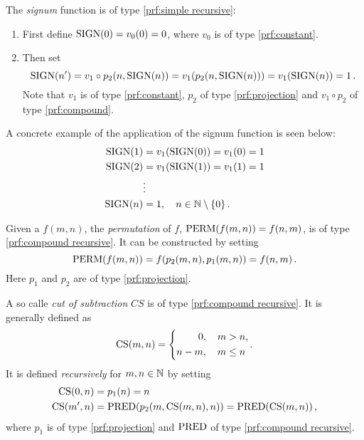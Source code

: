 \documentclass[11pt,a4paper]{article}
\begin{document}
\begin{example}[VI]\label{exa:PRF sign}
    The \emph{signum} function is of type \eqref{prf:simple recursive}:
    \begin{enumerate}
        \item First define \(\operatorname{SIGN}(0) = v_0(0)  = 0\),
            where \(v_0\) is of type \eqref{prf:constant}.
        \item Then set \[\operatorname{SIGN}(n') = v_1\circ p_2(n,\operatorname{SIGN}(n))
            = v_1(p_2(n,\operatorname{SIGN}(n))) = v_1(\operatorname{SIGN}(n)) = 1\,.\]
            Note that \(v_1\) is of type \eqref{prf:constant},
            \(p_2\) of type \eqref{prf:projection}
            and \(v_1\circ p_2\) of type \eqref{prf:compound}.
    \end{enumerate}
\end{example}

A concrete example of the application of the signum function
is seen below:
\begin{align*}
    \operatorname{SIGN}(1) &= v_1(\operatorname{SIGN}(0)) = v_1(0) = 1 \\
    \operatorname{SIGN}(2) &= v_1(\operatorname{SIGN}(1)) = v_1(1) = 1 \\
             &\vdots \\
    \operatorname{SIGN}(n) &= 1, \quad n\in\mathbb{N}\setminus\{0\}\,.
\end{align*}

\begin{example}[VII]\label{exa:PRF permutation}
    Given a \PRF{} \(f(m,n)\), the \emph{permutation} of
    \(f\), \(\operatorname{PERM}(f(m,n)) = f(n,m)\), is of type
    \eqref{prf:compound recursive}. It can be constructed by setting
    \begin{equation*}
        \operatorname{PERM}(f(m,n)) = f(p_2(m,n), p_1(m,n)) = f(n,m)\,.
    \end{equation*}
    Here \(p_1\) and \(p_2\) are of type \eqref{prf:projection}.
\end{example}

\begin{example}[VIII]\label{exa:PRF cut of subtraction}
    A so calle \emph{cut of subtraction} \(CS\)
    is of type \eqref{prf:compound recursive}.
    It is generally defined as
    \begin{equation*}
        \operatorname{CS}(m,n) = \left\{
            \begin{aligned}
                0&,\quad m > n, \\
                n-m&,\quad m\leq n
            \end{aligned}\,.
        \right.
    \end{equation*}
    It is defined \emph{recursively} for \(m,n\in\mathbb{N}\) by setting
    \begin{align*}
        \operatorname{CS}(0,n)  &= p_1(n) = n\\
        \operatorname{CS}(m',n) &= \operatorname{PRED}(p_2(m,\operatorname{CS}(m,n),n)) = \operatorname{PRED}(\operatorname{CS}(m,n))\,,
    \end{align*}
    where \(p_1\) is of type \eqref{prf:projection} and \(\operatorname{PRED}\)
    of type \eqref{prf:compound recursive}.
\end{example}
\end{document}
